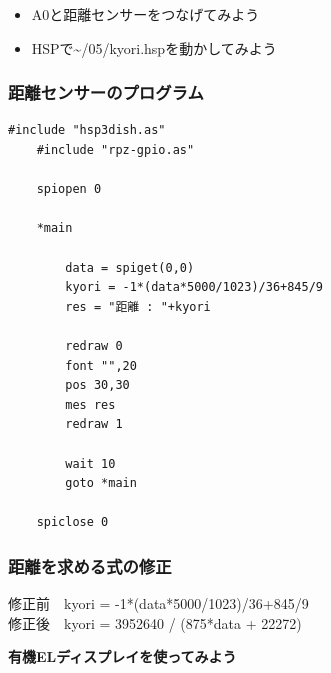 \begin{frame}[fragile]
\begin{columns}
\begin{column}{0.48\textwidth}
        \end{column}
    \end{columns}
    \begin{itemize}
        \item A0と距離センサーをつなげてみよう
        \item HSPで\textasciitilde/05/kyori.hspを動かしてみよう
    \end{itemize}
\end{frame}

\begin{frame}[fragile]
    \frametitle{距離センサーのプログラム}
    \begin{lstlisting}[title=\textasciitilde/05/kyori.hsp]
    #include "hsp3dish.as"
    #include "rpz-gpio.as"

    spiopen 0

    *main

	    data = spiget(0,0)
	    kyori = -1*(data*5000/1023)/36+845/9
	    res = "距離 : "+kyori
	
	    redraw 0
	    font "",20
	    pos 30,30
	    mes res
	    redraw 1

	    wait 10
	    goto *main

    spiclose 0
    \end{lstlisting}
\end{frame}

\begin{frame}
    \frametitle{距離を求める式の修正}
    修正前　kyori = -1*(data*5000/1023)/36+845/9\\
    \vspace{20pt}
	修正後　kyori = 3952640 / (875*data + 22272)
\end{frame}

\begin{frame}[plain]
    \begin{center}
        \vspace{48pt}
        {\huge\bf 有機ELディスプレイを使ってみよう}
    \end{center}
\end{frame}

